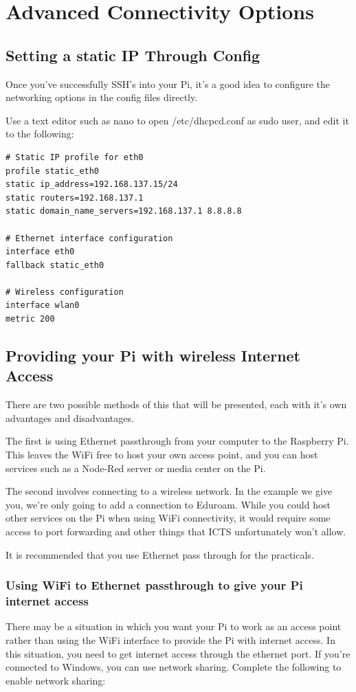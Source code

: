 \section{Advanced Connectivity Options}
\subsection{Setting a static IP Through Config}
Once you've successfully SSH's into your Pi, it's a good idea to configure the networking options in the config files directly.

Use a text editor such as nano to open /etc/dhcpcd.conf as sudo user, and edit it to the following:
\begin{lstlisting}
# Static IP profile for eth0
profile static_eth0
static ip_address=192.168.137.15/24
static routers=192.168.137.1
static domain_name_servers=192.168.137.1 8.8.8.8

# Ethernet interface configuration 
interface eth0
fallback static_eth0

# Wireless configuration
interface wlan0
metric 200
\end{lstlisting}

\subsection{Providing your Pi with wireless Internet Access}
There are two possible methods of this that will be presented, each with it's own advantages and disadvantages.

The first is using Ethernet passthrough from your computer to the Raspberry Pi. This leaves the WiFi free to host your own access point, and you can host services such as a Node-Red server or media center on the Pi.

The second involves connecting to a wireless network. In the example we give you, we're only going to add a connection to Eduroam. While you could host other services on the Pi when using WiFi connectivity, it would require some access to port forwarding and other things that ICTS unfortunately won't allow.

It is recommended that you use Ethernet pass through for the practicals.

\subsubsection{Using WiFi to Ethernet passthrough to give your Pi internet access}
There may be a situation in which you want your Pi to work as an access point rather than using the WiFi interface to provide the Pi with internet access. In this situation, you need to get internet access through the ethernet port. If you're connected to Windows, you can use network sharing. Complete the following to enable network sharing:

